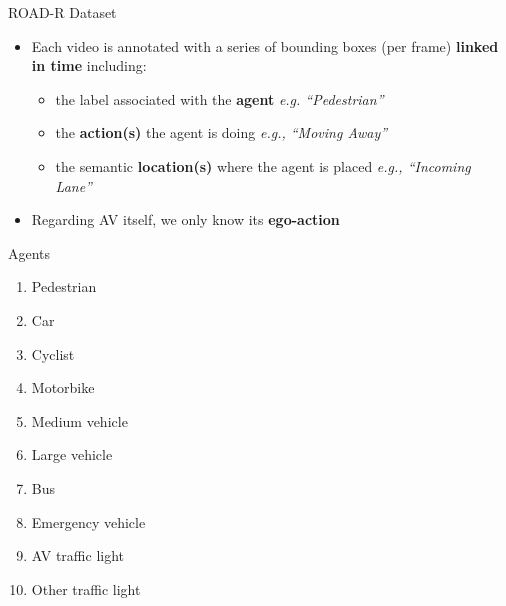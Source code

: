 \documentclass[10pt, aspectratio=169]{beamer}
\begin{document}
\begin{frame}{ROAD-R Dataset}
    \begin{itemize}
        \setlength{\itemsep}{13pt}
        \item Each video is annotated with a \textcolor{umBlueLighter}{series of bounding boxes} (per frame) \textbf{linked in time} including:
        \vspace{4pt}
        \begin{itemize}
            \setlength{\itemsep}{4pt}
            \item the label associated with the \textbf{agent} \textit{e.g. “Pedestrian”}
            \item the \textbf{action(s)} the agent is doing \textit{e.g., “Moving Away”} 
            \item the semantic \textbf{location(s)} where the agent is placed \textit{e.g., “Incoming Lane”}
        \end{itemize}
        \item Regarding AV itself, we only know its \textbf{ego-action}
    \end{itemize}
\end{frame}


\begin{frame}{Agents}
  \begin{multicols}{2}
        \begin{enumerate}
            \setlength\itemsep{1em}
            \item Pedestrian
            \item Car
            \item Cyclist
            \item Motorbike
            \item Medium vehicle
            \item Large vehicle
            \item Bus
            \item Emergency vehicle
            \item AV traffic light 
            \item Other traffic light
        \end{enumerate}
    \end{multicols}
\end{frame}
\end{document}
